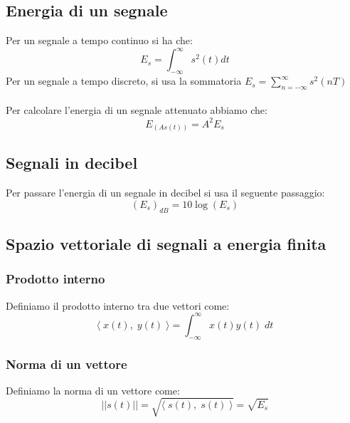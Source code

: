 \documentclass{article}
\begin{document}
\newpage
\subsection{Energia di un segnale}
Per un segnale a tempo continuo si ha che:
$$E_s=\int_{-\infty}^{\infty}s^2(t)dt$$
Per un segnale a tempo discreto, si usa la sommatoria $E_s=\sum_{n=-\infty}^{\infty}s^2(nT)$\\\\
Per calcolare l'energia di un segnale attenuato abbiamo che:
$$E_{(As(t))}=A^2E_s$$

\subsection{Segnali in decibel}
Per passare l'energia di un segnale in decibel si usa il seguente passaggio:
$$(E_s)_{dB}=10\log(E_s)$$

\subsection{Spazio vettoriale di segnali a energia finita}

\subsubsection{Prodotto interno}
Definiamo il prodotto interno tra due vettori come:
$$\langle\;x(t),\;y(t)\;\rangle=\int_{-\infty}^{\infty}x(t)y(t)\;dt$$

\subsubsection{Norma di un vettore}
Definiamo la norma di un vettore come:
$$||s(t)||=\sqrt{\langle\;s(t),\;s(t)\;\rangle}=\sqrt{E_s}$$
\end{document}
